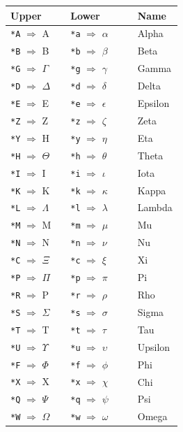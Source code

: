 \begin{longtable}{@{}llllll@{}}
\toprule
Upper & & Lower & & & Name \\
\midrule
\endhead
\texttt{*A} $\Rightarrow$ A & & \texttt{*a} $\Rightarrow$ $\alpha$ & & & Alpha \\
\texttt{*B} $\Rightarrow$ B & & \texttt{*b} $\Rightarrow$ $\beta$ & & & Beta \\
\texttt{*G} $\Rightarrow$ $\Gamma$ & & \texttt{*g} $\Rightarrow$ $\gamma$ & & & Gamma \\
\texttt{*D} $\Rightarrow$ $\Delta$ & & \texttt{*d} $\Rightarrow$ $\delta$ & & & Delta \\
\texttt{*E} $\Rightarrow$ E & & \texttt{*e} $\Rightarrow$ $\epsilon$ & & & Epsilon \\
\texttt{*Z} $\Rightarrow$ Z & & \texttt{*z} $\Rightarrow$ $\zeta$ & & & Zeta \\
\texttt{*Y} $\Rightarrow$ H & & \texttt{*y} $\Rightarrow$ $\eta$ & & & Eta \\
\texttt{*H} $\Rightarrow$ $\Theta$ & & \texttt{*h} $\Rightarrow$ $\theta$ & & & Theta \\
\texttt{*I} $\Rightarrow$ I & & \texttt{*i} $\Rightarrow$ $\iota$ & & & Iota \\
\texttt{*K} $\Rightarrow$ K & & \texttt{*k} $\Rightarrow$ $\kappa$ & & & Kappa \\
\texttt{*L} $\Rightarrow$ $\Lambda$ & & \texttt{*l} $\Rightarrow$ $\lambda$ & & & Lambda \\
\texttt{*M} $\Rightarrow$ M & & \texttt{*m} $\Rightarrow$ $\mu$ & & & Mu \\
\texttt{*N} $\Rightarrow$ N & & \texttt{*n} $\Rightarrow$ $\nu$ & & & Nu \\
\texttt{*C} $\Rightarrow$ $\Xi$ & & \texttt{*c} $\Rightarrow$ $\xi$ & & & Xi \\
\texttt{*P} $\Rightarrow$ $\Pi$ & & \texttt{*p} $\Rightarrow$ $\pi$ & & & Pi \\
\texttt{*R} $\Rightarrow$ P & & \texttt{*r} $\Rightarrow$ $\rho$ & & & Rho \\
\texttt{*S} $\Rightarrow$ $\Sigma$ & & \texttt{*s} $\Rightarrow$ $\sigma$ & & & Sigma \\
\texttt{*T} $\Rightarrow$ T & & \texttt{*t} $\Rightarrow$ $\tau$ & & & Tau \\
\texttt{*U} $\Rightarrow$ $\Upsilon$ & & \texttt{*u} $\Rightarrow$ $\upsilon$ & & & Upsilon \\
\texttt{*F} $\Rightarrow$ $\Phi$ & & \texttt{*f} $\Rightarrow$ $\phi$ & & & Phi \\
\texttt{*X} $\Rightarrow$ X & & \texttt{*x} $\Rightarrow$ $\chi$ & & & Chi \\
\texttt{*Q} $\Rightarrow$ $\Psi$ & & \texttt{*q} $\Rightarrow$ $\psi$ & & & Psi \\
\texttt{*W} $\Rightarrow$ $\Omega$ & & \texttt{*w} $\Rightarrow$ $\omega$ & & & Omega \\
\bottomrule
\end{longtable}

